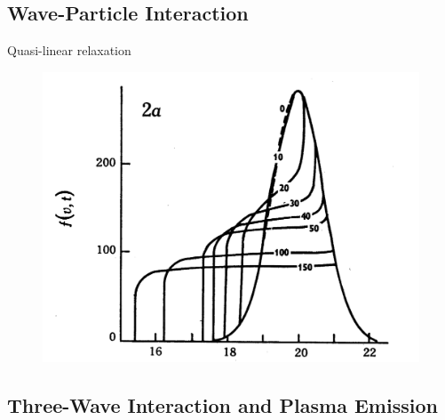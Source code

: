 \subsection{Wave-Particle Interaction}\label{sec:31}

Quasi-linear relaxation
\begin{figure}[!t]
\begin{center}
\includegraphics[scale=0.35, trim = 4cm 0cm 0cm 0cm]{images/Grognard1975}
\end{center}
\end{figure}


\subsection{Three-Wave Interaction and Plasma Emission}\label{sec:32}


